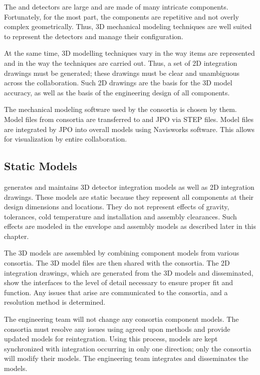 The  and  detectors are large and are made of many
intricate components. Fortunately, for the most part, the
components are repetitive and not overly complex
geometrically. Thus, 3D mechanical modeling techniques are well suited
to represent the detectors and manage their configuration.

At the same time, 3D modelling techniques vary in the way items are
represented and in the way the techniques are carried out. Thus, a set
of 2D integration drawings must be generated; these drawings must be
clear and unambiguous across the collaboration. Such 2D drawings are
the basis for the 3D model accuracy, as well as the basis of the engineering
design of all components.

The mechanical modeling software used by the consortia is chosen by
them. Model files from consortia are transferred to  and JPO
via STEP files. Model files are integrated by JPO into overall models
using Navisworks software. This allows for visualization by entire
collaboration.

\subsection{Static Models}
\label{sec:fdsp-coord-integ-static}

 generates and maintains 3D detector integration models as
well as 2D integration drawings. These models are static because they
represent all components at their design dimensions and
locations. They do not represent effects of gravity, tolerances, cold
temperature and installation and assembly clearances. Such effects are
modeled in the envelope and assembly models as described later in this
chapter.


The 3D models are assembled by combining component models from various
consortia. The 3D model files are then shared with the consortia. The 2D integration drawings, which are generated from
the 3D models and disseminated, show the interfaces to the level of
detail necessary to ensure proper fit and function. Any issues that
arise are communicated to the consortia, and a resolution method is
determined. 

The  engineering team will not change any consortia
component models.  The consortia must resolve any issues using agreed
upon methods and provide updated models for reintegration. Using this
process, models are kept synchronized with integration occurring in
only one direction; only the consortia will modify their models. The
 engineering team integrates and disseminates the models.


